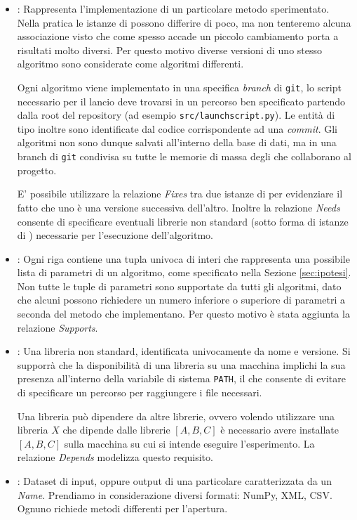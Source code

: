 \documentclass{article}
\begin{document}
\begin{itemize}
    \item {}: Rappresenta l'implementazione di un particolare metodo sperimentato. Nella pratica le istanze di  possono differire di poco, ma non tenteremo alcuna associazione visto che come spesso accade un piccolo cambiamento porta a risultati molto diversi. Per questo motivo diverse versioni di uno stesso algoritmo sono considerate come algoritmi differenti.

    Ogni algoritmo viene implementato in una specifica \emph{branch} di \texttt{git}, lo script necessario per il lancio deve trovarsi in un percorso ben specificato partendo dalla root del repository (ad esempio \texttt{src/launchscript.py}). Le entità di tipo  inoltre sono identificate dal codice corrispondente ad una \emph{commit}. Gli algoritmi non sono dunque salvati all'interno della base di dati, ma in una branch di \texttt{git} condivisa su tutte le memorie di massa degli  che collaborano al progetto.

    E' possibile utilizzare la relazione \emph{Fixes} tra due istanze di  per evidenziare il fatto che uno è una versione successiva dell'altro. Inoltre la relazione \emph{Needs} consente di specificare eventuali librerie non standard (sotto forma di istanze di ) necessarie per l'esecuzione dell'algoritmo.
    \item {}: Ogni riga contiene una tupla univoca di interi che rappresenta una possibile lista di parametri di un algoritmo, come specificato nella Sezione \ref{sec:ipotesi}. Non tutte le tuple di parametri sono supportate da tutti gli algoritmi, dato che alcuni possono richiedere un numero inferiore o superiore di parametri a seconda del metodo che implementano. Per questo motivo è stata aggiunta la relazione \emph{Supports}.
    \item {}: Una libreria non standard, identificata univocamente da nome e versione. Si supporrà che la disponibilità di una libreria su una macchina implichi la sua presenza all'interno della variabile di sistema \texttt{PATH}, il che consente di evitare di specificare un percorso per raggiungere i file necessari.

    Una libreria può dipendere da altre librerie, ovvero volendo utilizzare una libreria $X$ che dipende dalle librerie $[A,B,C]$ è necessario avere installate $[A,B,C]$ sulla macchina su cui si intende eseguire l'esperimento. La relazione \emph{Depends} modelizza questo requisito.
    \item {}: Dataset di input, oppure output di una particolare  caratterizzata da un \emph{Name}. Prendiamo in considerazione diversi formati: NumPy, XML, CSV. Ognuno richiede metodi differenti per l'apertura.


\end{itemize}
\end{document}
